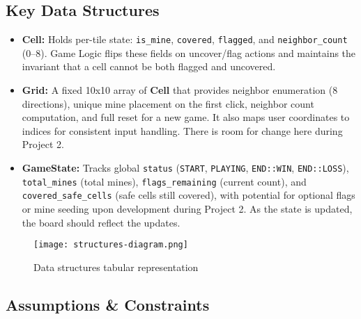 \documentclass[11pt]{article}
\begin{document}
\subsection{Key Data Structures}
\begin{itemize}
  \item \textbf{Cell:} Holds per-tile state: \texttt{is\_mine}, \texttt{covered}, \texttt{flagged}, and \texttt{neighbor\_count} (0–8). Game Logic flips these fields on uncover/flag actions and maintains the invariant that a cell cannot be both flagged and uncovered.
  
  \item \textbf{Grid:} A fixed 10x10 array of \textbf{Cell} that provides neighbor enumeration (8 directions), unique mine placement on the first click, neighbor count computation, and full reset for a new game. It also maps user coordinates to indices for consistent input handling. There is room for change here during Project 2.
  
\item \textbf{GameState:} Tracks global \texttt{status} (\texttt{START}, \texttt{PLAYING}, \texttt{END::WIN}, \texttt{END::LOSS}), \texttt{total\_mines} (total mines), \texttt{flags\_remaining} (current count), and \texttt{covered\_safe\_cells} (safe cells still covered), with potential for optional flags or mine seeding upon development during Project 2. As the state is updated, the board should reflect the updates.

\end{itemize}
\begin{figure}[ht]
\centering
\texttt{[image: structures-diagram.png]}
\caption{Data structures tabular representation}
\label{fig:structures}
\end{figure}

\subsection{Assumptions \& Constraints}
\end{document}
